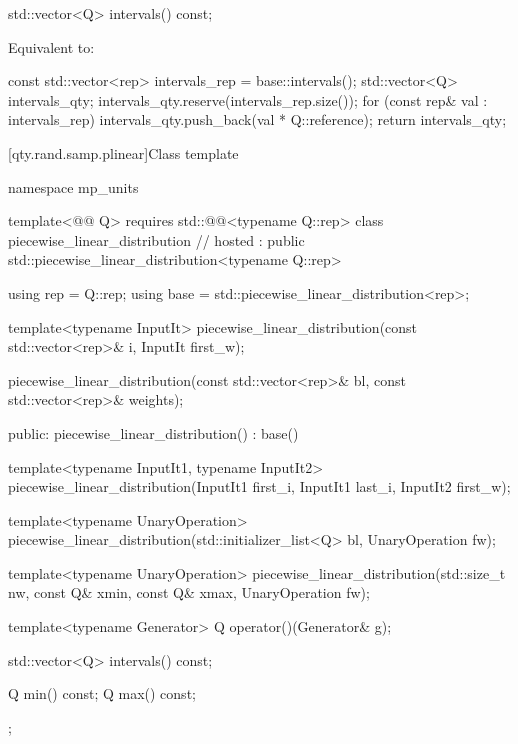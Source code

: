 \begin{itemdecl}
std::vector<Q> intervals() const;
\end{itemdecl}

\begin{itemdescr}
\pnum
\effects
Equivalent to:
\begin{codeblock}
const std::vector<rep> intervals_rep = base::intervals();
std::vector<Q> intervals_qty;
intervals_qty.reserve(intervals_rep.size());
for (const rep& val : intervals_rep) {
  intervals_qty.push_back(val * Q::reference);
}
return intervals_qty;
\end{codeblock}
\end{itemdescr}

[qty.rand.samp.plinear]{Class template }

\begin{codeblock}
namespace mp_units {
template<@@ Q>
  requires std::@@<typename Q::rep>
class piecewise_linear_distribution                                                     // hosted
    : public std::piecewise_linear_distribution<typename Q::rep> {
  using rep = Q::rep;
  using base = std::piecewise_linear_distribution<rep>;

  template<typename InputIt>
  piecewise_linear_distribution(const std::vector<rep>& i, InputIt first_w);

  piecewise_linear_distribution(const std::vector<rep>& bl, const std::vector<rep>& weights);

public:
  piecewise_linear_distribution() : base() {}

  template<typename InputIt1, typename InputIt2>
  piecewise_linear_distribution(InputIt1 first_i, InputIt1 last_i, InputIt2 first_w);

  template<typename UnaryOperation>
  piecewise_linear_distribution(std::initializer_list<Q> bl, UnaryOperation fw);

  template<typename UnaryOperation>
  piecewise_linear_distribution(std::size_t nw, const Q& xmin, const Q& xmax, UnaryOperation fw);

  template<typename Generator>
  Q operator()(Generator& g);

  std::vector<Q> intervals() const;

  Q min() const;
  Q max() const;
};
}
\end{codeblock}

